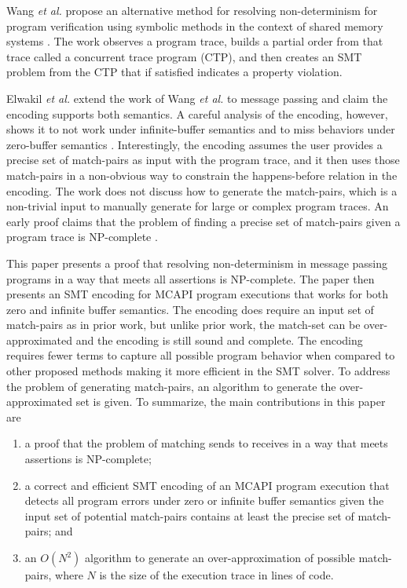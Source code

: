 Wang \textit{et al.} propose an alternative method for resolving
non-determinism for program verification using symbolic methods in the context
of shared memory systems \cite{wang:fse09}. The work observes a
program trace, builds a partial order from that trace called a
concurrent trace program (CTP), and then creates an SMT problem from
the CTP that if satisfied indicates a property violation. 

\examplefigone

Elwakil \textit{et al.} extend the work of Wang \textit{et al.} to
message passing and claim the encoding supports both semantics. A
careful analysis of the encoding, however, shows it to not work under
infinite-buffer semantics and to miss behaviors under zero-buffer
semantics \cite{elwakil:padtad10}. Interestingly, the encoding assumes
the user provides a precise set of match-pairs as input with the
program trace, and it then uses those match-pairs in a non-obvious way
to constrain the happens-before relation in the encoding. The work
does not discuss how to generate the match-pairs, which is a
non-trivial input to manually generate for large or complex program
traces. An early proof claims that the problem of finding a precise
set of match-pairs given a program trace is NP-complete
\cite{match-pair-np-complete}.

 This paper presents a proof that resolving non-determinism in message
 passing programs in a way that meets all assertions is
 NP-complete. The paper then presents an SMT encoding for MCAPI
 program executions that works for both zero and infinite buffer
 semantics. The encoding does require an input set of match-pairs as
 in prior work, but unlike prior work, the match-set can be
 over-approximated and the encoding is still sound and complete. The
 encoding requires fewer terms to capture all possible program
 behavior when compared to other proposed methods making it more
 efficient in the SMT solver.  To address the problem of generating
 match-pairs, an algorithm to generate the over-approximated set is
 given. To summarize, the main contributions in this paper are

\begin{enumerate}
\item a proof that the problem of matching sends to receives in a way that meets assertions is NP-complete;
\item a correct and efficient SMT encoding of an MCAPI program
  execution that detects all program errors under zero or infinite
  buffer semantics given the input set of potential match-pairs
  contains at least the precise set of match-pairs; and
\item an $O(N^2)$ algorithm to generate an over-approximation of
  possible match-pairs, where $N$ is the size of the execution trace
  in lines of code.
\end{enumerate}

